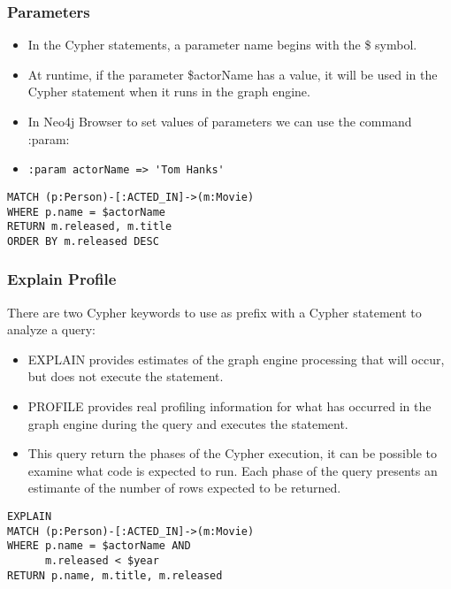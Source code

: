 \begin{frame}[fragile]\frametitle{Parameters}

\begin{itemize}
\item In the Cypher statements, a parameter name begins with the \$ symbol.
\item At runtime, if the parameter \$actorName has a value, it will be used in the Cypher statement when it runs in the graph engine.
\item In Neo4j Browser to set values of parameters we can use the command :param:
\item \lstinline|:param actorName => 'Tom Hanks'|
\end{itemize}

\begin{lstlisting}
MATCH (p:Person)-[:ACTED_IN]->(m:Movie)
WHERE p.name = $actorName
RETURN m.released, m.title
ORDER BY m.released DESC
\end{lstlisting}

\end{frame}

\begin{frame}[fragile]\frametitle{Explain Profile}

There are two Cypher keywords to use as prefix with a Cypher statement to analyze a query:
\begin{itemize}
\item EXPLAIN provides estimates of the graph engine processing that will occur, but does not execute the statement.
\item PROFILE provides real profiling information for what has occurred in the graph engine during the query and executes the statement.
\item This query return the phases of the Cypher execution, it can be possible to examine what code is expected to run. Each phase of the query presents an estimante of the number of rows expected to be returned.
\end{itemize}

\begin{lstlisting}
EXPLAIN
MATCH (p:Person)-[:ACTED_IN]->(m:Movie)
WHERE p.name = $actorName AND
      m.released < $year
RETURN p.name, m.title, m.released

\end{lstlisting}

\end{frame}



